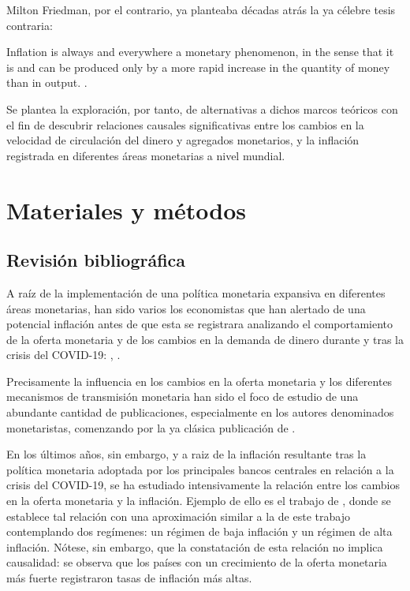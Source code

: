 \documentclass[titlepage, 12pt]{article}
\begin{document}
Milton Friedman, por el contrario, ya planteaba décadas atrás la ya célebre tesis contraria:
\begin{displayquote}
    Inflation is always and everywhere a monetary phenomenon, in the sense that it is and can be produced only by a more rapid increase in the quantity of money than in output. \autocite[24]{friedman1970}.
\end{displayquote}

Se plantea la exploración, por tanto, de alternativas a dichos marcos teóricos con el fin de descubrir relaciones causales significativas entre los cambios en la velocidad de circulación del dinero y agregados monetarios, y la inflación registrada en diferentes áreas monetarias a nivel mundial.

\section{Materiales y métodos}

\subsection{Revisión bibliográfica}

A raíz de la implementación de una política monetaria expansiva en diferentes áreas monetarias, han sido varios los economistas que han alertado de una potencial inflación antes de que esta se registrara analizando el comportamiento de la oferta monetaria y de los cambios en la demanda de dinero durante y tras la crisis del COVID-19: \cite{castaneda2020}, \cite{congdon2020}.

Precisamente la influencia en los cambios en la oferta monetaria y los diferentes mecanismos de transmisión monetaria han sido el foco de estudio de una abundante cantidad de publicaciones, especialmente en los autores denominados monetaristas, comenzando por la ya clásica publicación de \cite{friedman1956}.

En los últimos años, sin embargo, y a raiz de la inflación resultante tras la política monetaria adoptada por los principales bancos centrales en relación a la crisis del COVID-19, se ha estudiado intensivamente la relación entre los cambios en la oferta monetaria y la inflación. Ejemplo de ello es el trabajo de \cite{borio2023}, donde se establece tal relación con una aproximación similar a la de este trabajo contemplando dos regímenes: un régimen de baja inflación y un régimen de alta inflación. Nótese, sin embargo, que la constatación de esta relación no implica causalidad: se observa que los países con un crecimiento de la oferta monetaria más fuerte registraron tasas de inflación más altas.
\end{document}
